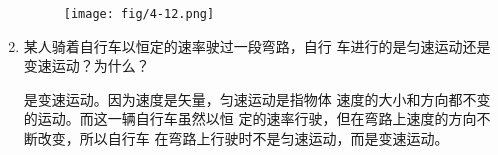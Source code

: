 \begin{enumerate}
\begin{solution}
\begin{figure}[htp]
    \centering
    \texttt{[image: fig/4-12.png]}
    \caption{}
\end{figure}
\end{solution}
\item 某人骑着自行车以恒定的速率驶过一段弯路，自行
车进行的是匀速运动还是变速运动？为什么？

\begin{solution}
    是变速运动。因为速度是矢量，匀速运动是指物体
    速度的大小和方向都不变的运动。而这一辆自行车虽然以恒
    定的速率行驶，但在弯路上速度的方向不断改变，所以自行车
    在弯路上行驶时不是匀速运动，而是变速运动。
\end{solution}
\end{enumerate}



